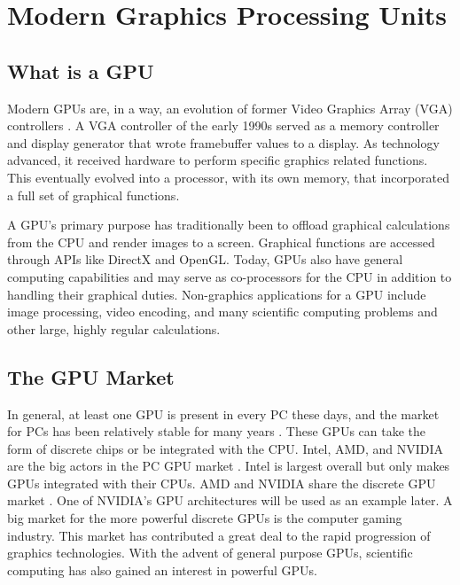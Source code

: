 \documentclass[../main/report.tex]{subfiles}
\begin{document}
\chapter{Modern Graphics Processing Units}
\label{sec:modern_gpu}

\section{What is a GPU}

Modern GPUs are, in a way, an evolution of former Video Graphics Array (VGA) controllers \cite{gpu_appendix}.
A VGA controller of the early 1990s served as a memory controller and display generator that wrote framebuffer values to a display.
As technology advanced, it received hardware to perform specific graphics related functions.
This eventually evolved into a processor, with its own memory, that incorporated a full set of graphical functions.

A GPU's primary purpose has traditionally been to offload graphical calculations from the CPU and render images to a screen.
Graphical functions are accessed through APIs like DirectX and OpenGL.
Today, GPUs also have general computing capabilities and may serve as co-processors for the CPU in addition to handling their graphical duties.
Non-graphics applications for a GPU include image processing, video encoding, and many scientific computing problems and other large, highly regular calculations.


\section{The GPU Market}




In general, at least one GPU is present in every PC these days, and the market for PCs has been relatively stable for many years \cite{pc_sales}.
These GPUs can take the form of discrete chips or be integrated with the CPU.
Intel, AMD, and NVIDIA are the big actors in the PC GPU market \cite{gpu_overall_sales}.
Intel is largest overall but only makes GPUs integrated with their CPUs.
AMD and NVIDIA share the discrete GPU market \cite{gpu_discrete_sales}.
One of NVIDIA's GPU architectures will be used as an example later.
A big market for the more powerful discrete GPUs is the computer gaming industry.
This market has contributed a great deal to the rapid progression of graphics technologies.
With the advent of general purpose GPUs, scientific computing has also gained an interest in powerful GPUs.
\end{document}

